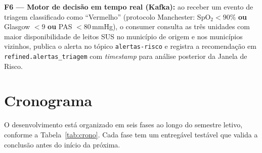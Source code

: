 \documentclass[12pt]{article}
\begin{document}
\textbf{F6 — Motor de decisão em tempo real (Kafka):}
ao receber um evento de triagem classificado como ``Vermelho'' (protocolo
Manchester: SpO$_2 < 90\%$ \textbf{ou} Glasgow $< 9$ \textbf{ou} PAS $< 80$\,mmHg),
o consumer consulta as três unidades com maior disponibilidade de leitos SUS
no município de origem e nos municípios vizinhos, publica o alerta no tópico
\texttt{alertas-risco} e registra a recomendação em
\texttt{refined.alertas\_triagem} com \textit{timestamp} para análise
posterior da Janela de Risco.


\section{Cronograma}

O desenvolvimento está organizado em seis fases ao longo do semestre letivo,
conforme a Tabela~\ref{tab:crono}. Cada fase tem um entregável testável
que valida a conclusão antes do início da próxima.
\end{document}
